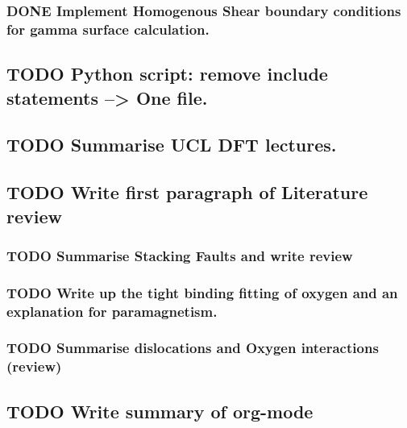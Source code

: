 \documentclass[11pt]{article}
\begin{document}
\subsubsection{{\bfseries\sffamily DONE} Implement Homogenous Shear boundary conditions for gamma surface calculation.}
\label{sec:orgfa23725}
\subsection{{\bfseries\sffamily TODO} Python script: remove include statements  -->  One file.}
\label{sec:orge2d45ef}
\subsection{{\bfseries\sffamily TODO} Summarise UCL DFT lectures.}
\label{sec:orgef22b77}
\subsection{{\bfseries\sffamily TODO} Write first paragraph of Literature review}
\label{sec:org1113f13}
\subsubsection{{\bfseries\sffamily TODO} Summarise Stacking Faults and write review}
\label{sec:orgfcf0382}
\subsubsection{{\bfseries\sffamily TODO} Write up the tight binding fitting of oxygen and an explanation for paramagnetism.}
\label{sec:org5909368}
\subsubsection{{\bfseries\sffamily TODO} Summarise dislocations and Oxygen interactions (review)}
\label{sec:org00766a0}
\subsection{{\bfseries\sffamily TODO} Write summary of org-mode}
\label{sec:org829e2e4}
\end{document}
